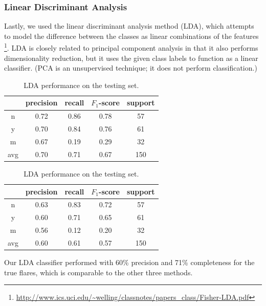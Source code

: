 \documentclass[11pt]{article}
\begin{document}
\subsubsection{Linear Discriminant Analysis}
\label{sec:lda}
Lastly, we used the linear discriminant analysis method (LDA), which
attempts to model the difference between the classes as linear
combinations of the features
\footnote{\url{http://www.ics.uci.edu/~welling/classnotes/papers_class/Fisher-LDA.pdf}}.
LDA is closely related to principal component analysis in that it also
performs dimensionality reduction, but it uses the given class labels
to function as a linear classifier. (PCA is an unsupervised technique;
it does not perform classification.)
\begin{table}
  \centering
  \begin{tabular}[!htbp]{c|c c c c}
       & precision &recall &$F_1$-score &support \\ \hline
    n  & 0.72      &0.86   &0.78     &57      \\
    y  & 0.70      &0.84   &0.76     &61      \\
    m  & 0.67      &0.19   &0.29     &32      \\ \hline
    avg& 0.70      &0.71   &0.67     &150     \\
  \end{tabular}
  \caption{Reconstructing the training set with LDA.}

  \begin{tabular}[!htbp]{c|c c c c}
        & precision &recall &$F_1$-score &support \\ \hline
    n   & 0.63      &0.83   &0.72     &57      \\
    y   & 0.60      &0.71   &0.65     &61      \\
    m   & 0.56      &0.12   &0.20     &32      \\ \hline
    avg & 0.60      &0.61   &0.57     &150     \\
  \end{tabular}
  \caption{LDA performance on the testing set.}
\end{table}
Our LDA classifier performed with 60\% precision and 71\% completeness
for the true flares, which is comparable to the other three methods.

\end{document}
